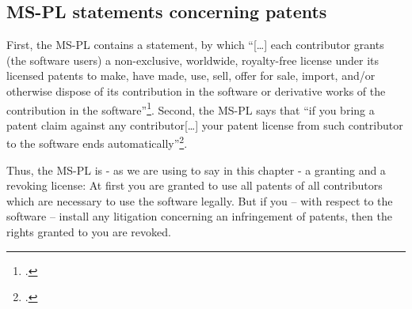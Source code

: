 \subsection{MS-PL statements concerning patents}\label{subsec:MsplPatentClause}

First, the MS-PL contains a statement, by which \enquote{[\ldots] each
contributor grants (the software users) a non-exclusive, worldwide, royalty-free
license under its licensed patents to make, have made, use, sell, offer for
sale, import, and/or otherwise dispose of its contribution in the software or
derivative works of the contribution in the software}\footcite[cf.][\nopage wp
§2.B]{MsplOsiLicense2013a}. Second, the MS-PL says that \enquote{if you bring a
patent claim against any contributor[\ldots] your patent license from such
contributor to the software ends automatically}\footcite[cf.][\nopage wp
§3.B]{MsplOsiLicense2013a}.

Thus, the MS-PL is - as we are using to say in this chapter - a granting and a
revoking license: At first you are granted to use all patents of all
contributors which are necessary to use the software legally. But if you -- with
respect to the software -- install any litigation concerning an infringement of
patents, then the rights granted to you are revoked.




% 
